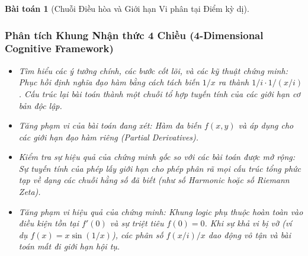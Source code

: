 \documentclass{article}
\newtheorem{baitoan}{Bài toán}
\begin{document}
\begin{baitoan}[Chuỗi Điều hòa và Giới hạn Vi phân tại Điểm kỳ dị]
 \subsubsection*{Phân tích Khung Nhận thức 4 Chiều (4-Dimensional Cognitive Framework)}
 \begin{itemize}
 \item \textit{Tìm hiểu các ý tưởng chính, các bước cốt lõi, và các kỹ thuật chứng minh}: Phục hồi định nghĩa đạo hàm bằng cách tách biến $1/x$ ra thành $1/i \cdot 1/(x/i)$. Cấu trúc lại bài toán thành một chuỗi tổ hợp tuyến tính của các giới hạn cơ bản độc lập.
 \item \textit{Tăng phạm vi của bài toán đang xét}: Hàm đa biến $f(x, y)$ và áp dụng cho các giới hạn đạo hàm riêng (Partial Derivatives). 
 \item \textit{Kiểm tra sự hiệu quả của chứng minh gốc so với các bài toán được mở rộng}: Sự tuyến tính của phép lấy giới hạn cho phép phân rã mọi cấu trúc tổng phức tạp về dạng các chuỗi hằng số đã biết (như số Harmonic hoặc số Riemann Zeta).
 \item \textit{Tăng phạm vi hiệu quả của chứng minh}: Khung logic phụ thuộc hoàn toàn vào điều kiện tồn tại $f'(0)$ và sự triệt tiêu $f(0) = 0$. Khi sự khả vi bị vỡ (ví dụ $f(x) = x \sin(1/x)$), các phân số $f(x/i) / x$ dao động vô tận và bài toán mất đi giới hạn hội tụ.
 \end{itemize}
\end{baitoan}

\end{document}
